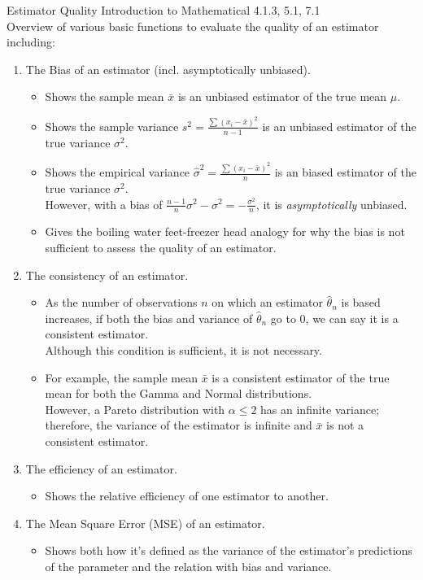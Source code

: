 \begin{CHPT_SUMM_AUTO_NUMB}[label = {L.-25}]{Estimator Quality}
Introduction to Mathematical  4.1.3, 5.1, 7.1\\


Overview of various basic functions to evaluate the quality of an estimator including:
\begin{enumerate}[leftmargin = *]
	\item	The Bias of an estimator (incl. asymptotically unbiased).
		\begin{itemize}[leftmargin = *]
		\item	Shows the sample mean $\bar{x}$ is an unbiased estimator of the true mean $\mu$.
		\item	Shows the sample variance $s^{2} = \frac{\sum (x_{i} - \bar{x})^{2}}{n - 1}$ is an unbiased estimator of the true variance $\sigma^{2}$.
		\item	Shows the empirical variance $\hat{\sigma}^{2} = \frac{\sum (x_{i} - \bar{x})^{2}}{n}$ is an biased estimator of the true variance $\sigma^{2}$.	\\
				However, with a bias of $\frac{n - 1}{n}\sigma^{2} - \sigma^{2} = -\frac{\sigma^{2}}{n}$, it is \textit{asymptotically} unbiased.
		\item	Gives the boiling water feet-freezer head analogy for why the bias is not sufficient to assess the quality of an estimator.
		\end{itemize}
	\item	The consistency of an estimator.
		\begin{itemize}[leftmargin = *]
		\item	As the number of observations $n$ on which an estimator $\hat{\theta}_{n}$ is based increases, if both the bias and variance of $\hat{\theta}_{n}$ go to 0, we can say it is a consistent estimator.	\\
				Although this condition is sufficient, it is not necessary.
		\item	For example, the sample mean $\bar{x}$ is a consistent estimator of the true mean for both the Gamma and Normal distributions.	\\
				However, a Pareto distribution with $\alpha \leq 2$ has an infinite variance; therefore, the variance of the estimator is infinite and $\bar{x}$ is not a consistent estimator.
		\end{itemize}
	\item	The efficiency of an estimator.
		\begin{itemize}[leftmargin = *]
		\item	Shows the relative efficiency of one estimator to another.
		\end{itemize}
	\item	The Mean Square Error (MSE) of an estimator.
		\begin{itemize}[leftmargin = *]
		\item	Shows both how it's defined as the variance of the estimator's predictions of the parameter and the relation with bias and variance.
		\end{itemize}
\end{enumerate}


\end{CHPT_SUMM_AUTO_NUMB}
